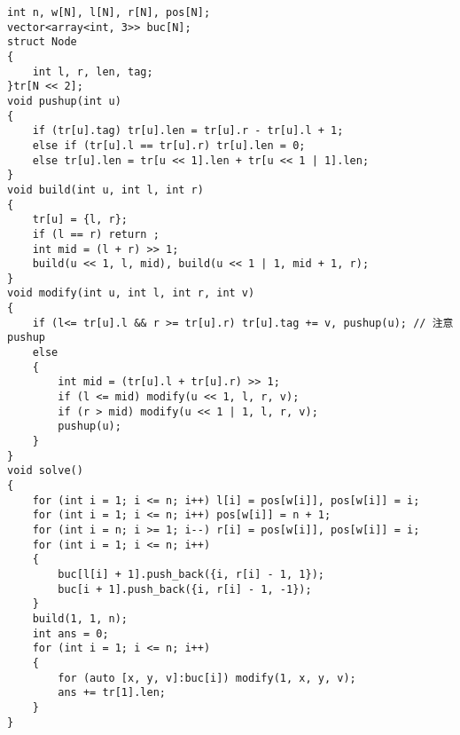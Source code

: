 \documentclass[a4paper, fontset=none]{ctexart}
\begin{document}
\begin{verbatim}
int n, w[N], l[N], r[N], pos[N];
vector<array<int, 3>> buc[N];
struct Node
{
    int l, r, len, tag;
}tr[N << 2];
void pushup(int u)
{
    if (tr[u].tag) tr[u].len = tr[u].r - tr[u].l + 1;
    else if (tr[u].l == tr[u].r) tr[u].len = 0;
    else tr[u].len = tr[u << 1].len + tr[u << 1 | 1].len;
}
void build(int u, int l, int r)
{
    tr[u] = {l, r};
    if (l == r) return ;
    int mid = (l + r) >> 1;
    build(u << 1, l, mid), build(u << 1 | 1, mid + 1, r);
}
void modify(int u, int l, int r, int v)
{
    if (l<= tr[u].l && r >= tr[u].r) tr[u].tag += v, pushup(u); // 注意 pushup
    else
    {
        int mid = (tr[u].l + tr[u].r) >> 1;
        if (l <= mid) modify(u << 1, l, r, v);
        if (r > mid) modify(u << 1 | 1, l, r, v);
        pushup(u);
    }
}
void solve()
{
    for (int i = 1; i <= n; i++) l[i] = pos[w[i]], pos[w[i]] = i;
    for (int i = 1; i <= n; i++) pos[w[i]] = n + 1;
    for (int i = n; i >= 1; i--) r[i] = pos[w[i]], pos[w[i]] = i;
    for (int i = 1; i <= n; i++)
    {
        buc[l[i] + 1].push_back({i, r[i] - 1, 1});
        buc[i + 1].push_back({i, r[i] - 1, -1});
    }
    build(1, 1, n);
    int ans = 0;
    for (int i = 1; i <= n; i++)
    {
        for (auto [x, y, v]:buc[i]) modify(1, x, y, v);
        ans += tr[1].len;
    }
}
\end{verbatim}
\end{document}
